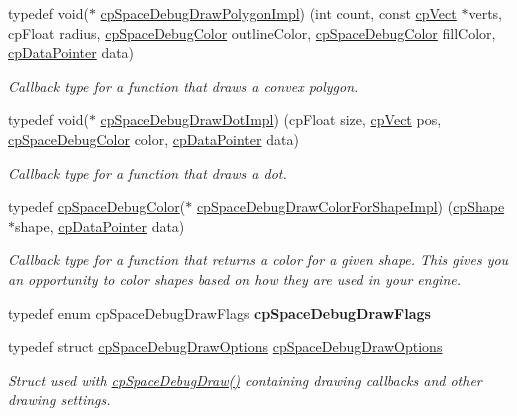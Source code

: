 \begin{DoxyCompactItemize}
typedef void($\ast$ \hyperlink{group__cpSpace_ga2138e846816a1e581a3433740a596ab6}{cp\+Space\+Debug\+Draw\+Polygon\+Impl}) (int count, const \hyperlink{structcpVect}{cp\+Vect} $\ast$verts, cp\+Float radius, \hyperlink{structcpSpaceDebugColor}{cp\+Space\+Debug\+Color} outline\+Color, \hyperlink{structcpSpaceDebugColor}{cp\+Space\+Debug\+Color} fill\+Color, \hyperlink{group__basicTypes_ga2ac2c3c31e21893941f9e4f8ee279447}{cp\+Data\+Pointer} data)
\begin{DoxyCompactList}\small\item\em Callback type for a function that draws a convex polygon. \end{DoxyCompactList}\item 
\mbox{\label{group__cpSpace_gadf9a758a2f1c3b53551829573b722e5a}} 
typedef void($\ast$ \hyperlink{group__cpSpace_gadf9a758a2f1c3b53551829573b722e5a}{cp\+Space\+Debug\+Draw\+Dot\+Impl}) (cp\+Float size, \hyperlink{structcpVect}{cp\+Vect} pos, \hyperlink{structcpSpaceDebugColor}{cp\+Space\+Debug\+Color} color, \hyperlink{group__basicTypes_ga2ac2c3c31e21893941f9e4f8ee279447}{cp\+Data\+Pointer} data)
\begin{DoxyCompactList}\small\item\em Callback type for a function that draws a dot. \end{DoxyCompactList}\item 
\mbox{\label{group__cpSpace_gaba1fec950f2b58c7c72ab5ca553bdf43}} 
typedef \hyperlink{structcpSpaceDebugColor}{cp\+Space\+Debug\+Color}($\ast$ \hyperlink{group__cpSpace_gaba1fec950f2b58c7c72ab5ca553bdf43}{cp\+Space\+Debug\+Draw\+Color\+For\+Shape\+Impl}) (\hyperlink{structcpShape}{cp\+Shape} $\ast$shape, \hyperlink{group__basicTypes_ga2ac2c3c31e21893941f9e4f8ee279447}{cp\+Data\+Pointer} data)
\begin{DoxyCompactList}\small\item\em Callback type for a function that returns a color for a given shape. This gives you an opportunity to color shapes based on how they are used in your engine. \end{DoxyCompactList}\item 
\mbox{\label{group__cpSpace_gaa625807338fd5ebd8f61463dead0c32b}} 
typedef enum cp\+Space\+Debug\+Draw\+Flags {\bfseries cp\+Space\+Debug\+Draw\+Flags}
\item 
\mbox{\label{group__cpSpace_gabb44b3d40332bc5965e8dbd515caa71a}} 
typedef struct \hyperlink{structcpSpaceDebugDrawOptions}{cp\+Space\+Debug\+Draw\+Options} \hyperlink{group__cpSpace_gabb44b3d40332bc5965e8dbd515caa71a}{cp\+Space\+Debug\+Draw\+Options}
\begin{DoxyCompactList}\small\item\em Struct used with \hyperlink{group__cpSpace_ga02e8a34681aff3f29bd976e830f3b6da}{cp\+Space\+Debug\+Draw()} containing drawing callbacks and other drawing settings. \end{DoxyCompactList}\end{DoxyCompactItemize}
